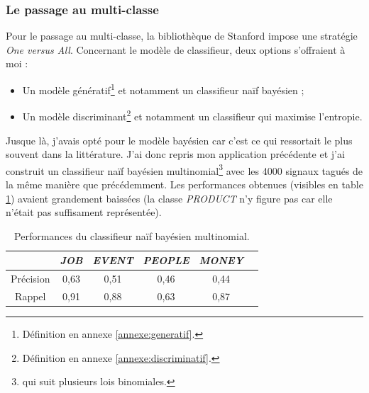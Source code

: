             \subsubsection{Le passage au multi-classe}
                Pour le passage au multi-classe, la bibliothèque de Stanford impose une stratégie \textit{One versus All}. Concernant le modèle de classifieur, deux options s'offraient à moi :
                \begin{itemize}
                    \item Un modèle génératif\footnote{Définition en annexe \ref{annexe:generatif}.} et notamment un classifieur naïf bayésien ;
                    \item Un modèle discriminant\footnote{Définition en annexe \ref{annexe:discriminatif}.} et notamment un classifieur qui maximise l'entropie.
                \end{itemize}
                Jusque là, j'avais opté pour le modèle bayésien car c'est ce qui ressortait le plus souvent dans la littérature. J'ai donc repris mon application précédente et j'ai construit un classifieur naïf bayésien multinomial\footnote{qui suit plusieurs lois binomiales.} avec les 4000 signaux tagués de la même manière que précédemment. Les performances obtenues (visibles en table \ref{tab:classif_perf2}) avaient grandement baissées (la classe \textit{PRODUCT} n'y figure pas car elle n'était pas suffisament représentée).
                \begin{table}[h]
                    \centering
                    \begin{tabular}{| c | c | c | c | c | c |}
                        \hline
                         & \textit{JOB} & \textit{EVENT} & \textit{PEOPLE} & \textit{MONEY} \\
                        \hline
                        Précision & 0,63 & 0,51 & 0,46 & 0,44 \\
                        Rappel & 0,91 & 0,88 & 0,63 & 0,87 \\
                        \hline
                    \end{tabular}
                    \caption{Performances du classifieur naïf bayésien multinomial.}
                    \label{tab:classif_perf2}
                \end{table}

